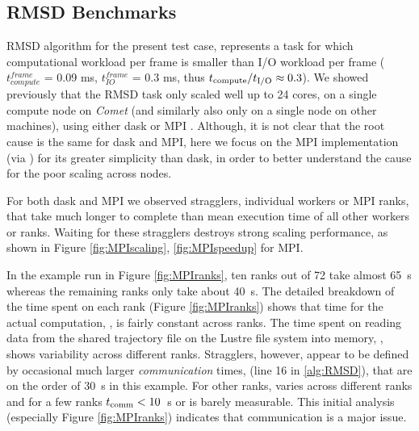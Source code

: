 \label{impl_exp}

\subsection{RMSD Benchmarks}
\label{sec:RMSD}
RMSD algorithm for the present test case, represents a task for which computational workload per frame is smaller than I/O workload per frame ($t_{compute}^{frame}$ = 0.09 ms, $t_{IO}^{frame}$ = 0.3 ms, thus ${t}_{\text{compute}}/{t}_{\text{I/O}} \approx 0.3$). 
We showed previously that the RMSD task only scaled well up to 24 cores, on a single compute node on \emph{Comet} (and similarly also only on a
single node on other machines), using either dask or MPI \cite{Khoshlessan:2017ab}. 
Although, it is not clear that the root cause is the same for dask and MPI, here we focus on the MPI
implementation (via  \cite{Dalcin:2011aa, Dalcin:2005aa}) for its greater simplicity than dask, in order to
better understand the cause for the poor scaling across nodes.

For both dask and MPI we observed stragglers, individual workers or
MPI ranks, that take much longer to complete than mean execution time of all other workers or ranks. 
Waiting for these stragglers destroys strong scaling performance, as shown in Figure \ref{fig:MPIscaling}, \ref{fig:MPIspeedup} for MPI. 

In the example run in Figure \ref{fig:MPIranks}, ten ranks out of 72 take almost 65~s whereas the
remaining ranks only take about 40~s. The detailed breakdown of the time spent on each rank (Figure \ref{fig:MPIranks}) shows that time
for the actual computation, \tcomp, is fairly constant across ranks. 
The time spent on reading data from the shared trajectory file on the Lustre file system into memory, \tIO, shows variability across different ranks. 
Stragglers, however, appear to be defined by occasional much larger \emph{communication} times, \tcomm (line 16 in \ref{alg:RMSD}), that are on the order of 30~s in this example. 
For other ranks, \tcomm varies across different ranks and for a few ranks $t_{\text{comm}} < 10$~s or is barely measurable. 
This initial analysis (especially Figure \ref{fig:MPIranks}) indicates that communication is a major issue. 

